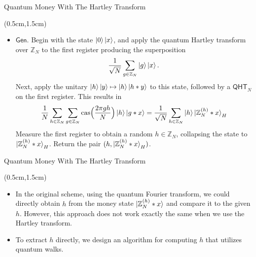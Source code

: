 \documentclass{beamer}
\theoremstyle{definition}
\newcommand{\cas}{\mathrm{cas}}
\newcommand{\qht}{\mathsf{QHT}}
\newcommand{\gen}{\mathsf{Gen}}
\begin{document}
\begin{frame}{Quantum Money With The Hartley Transform}
    
    \begin{textblock*}{12cm}(0.5cm,1.5cm)
            
        
       
        \begin{itemize}
            \item $\gen$. Begin with the state $\ket{0}\ket{x}$, and apply the quantum Hartley transform over $\mathbb{Z}_N$ to the first register producing the superposition
            \[ \frac{1}{\sqrt{N}} \sum_{g \in \mathbb{Z}_N} \ket{g}\ket{x}. \]
            Next, apply the unitary $\ket{h}\ket{y} \mapsto \ket{h}\ket{h * y}$ to this state, followed by a $\qht_N$ on the first register. This results in
            \[ \frac{1}{N} \sum_{h \in \mathbb{Z}_N} \sum_{g \in \mathbb{Z}_N} \cas\Big(\frac{2\pi gh}{N}\Big) \ket{h}\ket{g * x} = \frac{1}{\sqrt{N}} \sum_{h \in \mathbb{Z}_N} \ket{h} \ket{\mathbb{Z}_N^{(h)} * x}_H \]
            Measure the first register to obtain a random $h \in \mathbb{Z}_N$, collapsing the state to $\ket{\mathbb{Z}_N^{(h)} * x}_H$. Return the pair $(h, \ket{\mathbb{Z}_N^{(h)} * x}_H)$.

        \end{itemize}
        
       
        
    \end{textblock*}


\end{frame}





\begin{frame}{Quantum Money With The Hartley Transform}
    
    \begin{textblock*}{12cm}(0.5cm,1.5cm)
        \begin{itemize}
            \item  In the original scheme, using the quantum Fourier transform, we could directly obtain $h$ from the money state $\ket{\mathbb{Z}_N^{(h)} * x}$ and compare it to the given $h$. However, this approach does not work exactly the same when we use the Hartley transform. 
            \vspace{1cm}
            \item  To extract $h$ directly, we design an algorithm for computing $h$ that utilizes quantum walks. 

        \end{itemize}
        
        
       
        
    \end{textblock*}


\end{frame}
\end{document}
